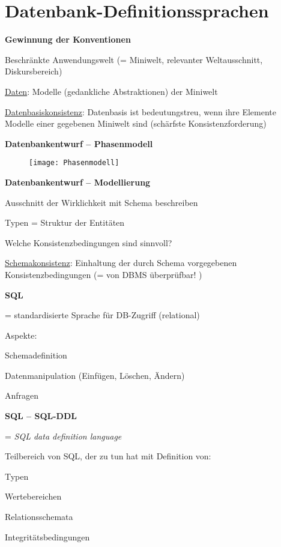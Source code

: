 \section{Datenbank-Definitionssprachen}
\label{sec:definitionssprachen}

\textbf{Gewinnung der Konventionen}
\begin{items}
	\item Beschränkte Anwendungswelt (= Miniwelt, relevanter Weltausschnitt, Diskursbereich)
	\item \underline{Daten}: Modelle (gedankliche Abstraktionen) der Miniwelt
	\item \underline{Datenbasiskonsistenz}: Datenbasis ist bedeutungstreu, wenn ihre Elemente Modelle einer gegebenen Miniwelt sind (schärfste Konsistenzforderung)
\end{items}

\textbf{Datenbankentwurf -- Phasenmodell}
\begin{figure}[H]\centering\label{Phasenmodell}\texttt{[image: Phasenmodell]}\end{figure}

\textbf{Datenbankentwurf -- Modellierung}
\begin{items}
	\item Ausschnitt der Wirklichkeit mit Schema beschreiben
	\item Typen = Struktur der Entitäten
	\item Welche Konsistenzbedingungen sind sinnvoll?
	\item \underline{Schemakonsistenz}: Einhaltung der durch Schema vorgegebenen Konsistenzbedingungen (= von DBMS überprüfbar! )
\end{items}

\textbf{SQL}
\begin{items}
	\item = standardisierte Sprache für DB-Zugriff (relational)
	\item Aspekte:
	\begin{enumeration}
		\item Schemadefinition
		\item Datenmanipulation (Einfügen, Löschen, Ändern)
		\item Anfragen
	\end{enumeration}
\end{items}

\newpage

\textbf{SQL -- SQL-DDL}
\begin{items}
	\item = \emph{SQL data definition language}
	\item Teilbereich von SQL, der zu tun hat mit Definition von:
	\begin{enumeration}
		\item Typen
		\item Wertebereichen
		\item Relationsschemata
		\item Integritätsbedingungen
	\end{enumeration}
\end{items}

